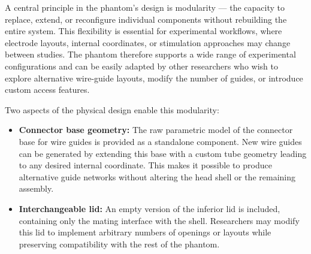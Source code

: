 A central principle in the phantom’s design is modularity — the capacity to replace, extend, or reconfigure individual components without rebuilding the entire system. This flexibility is essential for experimental workflows, where electrode layouts, internal coordinates, or stimulation approaches may change between studies. The phantom therefore supports a wide range of experimental configurations and can be easily adapted by other researchers who wish to explore alternative wire-guide layouts, modify the number of guides, or introduce custom access features.

Two aspects of the physical design enable this modularity:

\begin{itemize}
    \item \textbf{Connector base geometry:}  
    The raw parametric model of the connector base for wire guides is provided as a standalone component. New wire guides can be generated by extending this base with a custom tube geometry leading to any desired internal coordinate. This makes it possible to produce alternative guide networks without altering the head shell or the remaining assembly.

    \item \textbf{Interchangeable lid:}  
    An empty version of the inferior lid is included, containing only the mating interface with the shell. Researchers may modify this lid to implement arbitrary numbers of openings or layouts while preserving compatibility with the rest of the phantom.
\end{itemize}
